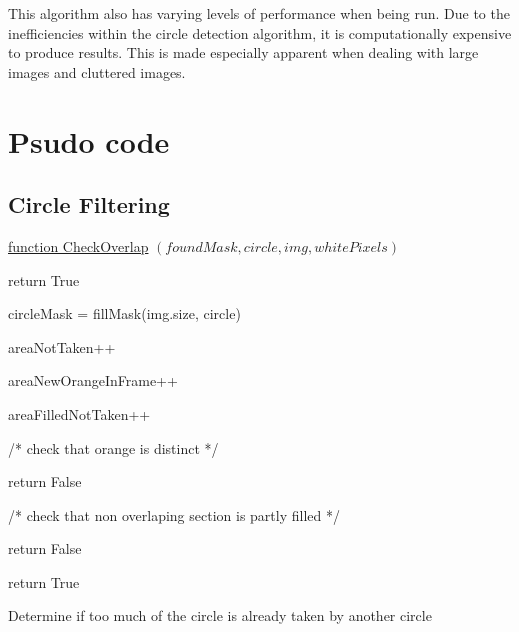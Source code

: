 \documentclass[conference]{IEEEtran}
\begin{document}
This algorithm also has varying levels of performance when being run. Due to the inefficiencies within the circle detection algorithm, it is computationally expensive to produce results. This is made especially apparent when dealing with large images and cluttered images.



\section{Psudo code}

\subsection{Circle Filtering}


\begin{algorithm} 

    \underline{function CheckOverlap} $(foundMask, circle, img, whitePixels)$\;
    
    {
    	return True
    }
        
    circleMask = fillMask(img.size, circle)
    
    {
	 {
		{
			areaNotTaken++
		}
		
		{
			areaNewOrangeInFrame++
		}
		
		{
			areaFilledNotTaken++
		}
	 }
    }
    
    /* check that orange is distinct */
    
     {
	return False
    }
    
    /* check that non overlaping section is partly filled */
    
     {
	return False
    }
    
    return True
    
    \caption{Determine if too much of the circle is already taken by another circle} \label{CheckOverlapAlg}
\end{algorithm}
\end{document}
